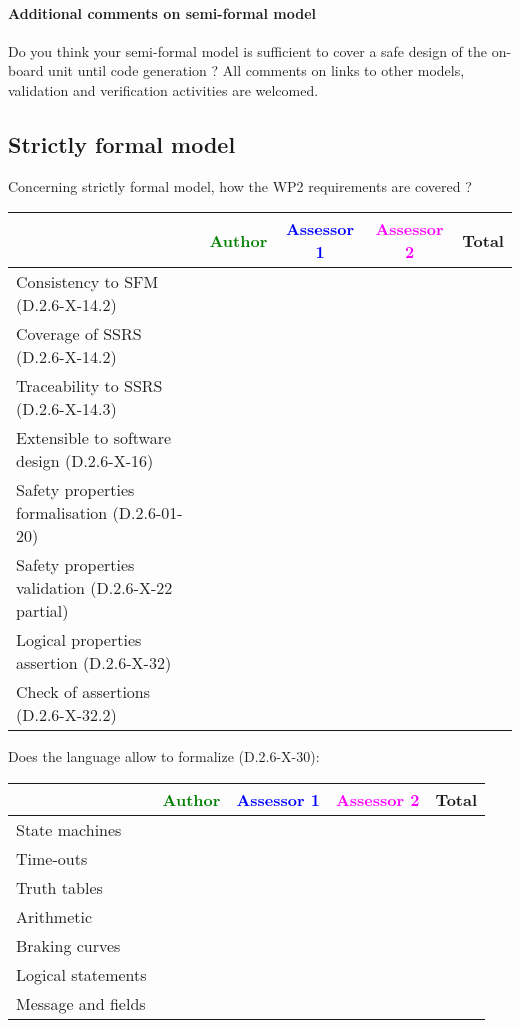 \paragraph{Additional comments on semi-formal  model} Do you think your semi-formal  model is sufficient to cover a safe design of the on-board unit until code generation ?
All comments on links to  other models, validation and verification activities are welcomed.

\subsection{Strictly formal model}

Concerning strictly formal model, how the WP2 requirements are covered ?

\begin{tabular}{|l | c | c | c | c|}
\hline
& \textcolor{green}{Author} & \textcolor{blue}{Assessor 1} & \textcolor{magenta}{Assessor 2} & Total \\
\hline 
Consistency to SFM (D.2.6-X-14.2) & & & &  \\
\hline
Coverage of SSRS (D.2.6-X-14.2)  & & & &  \\
\hline
Traceability to  SSRS (D.2.6-X-14.3)  & & & &  \\
\hline
Extensible to software design (D.2.6-X-16)  & & & &  \\
\hline
Safety properties formalisation (D.2.6-01-20)  & & & &  \\
\hline
Safety properties validation (D.2.6-X-22 partial)  & & & &  \\
\hline
Logical properties assertion (D.2.6-X-32)  & & & &  \\
\hline
Check  of assertions (D.2.6-X-32.2)  & & & &  \\
\hline
\end{tabular}

Does the language allow to  formalize (D.2.6-X-30):

\begin{tabular}{|l | c | c | c | c|}
\hline
& \textcolor{green}{Author} & \textcolor{blue}{Assessor 1} & \textcolor{magenta}{Assessor 2} & Total \\
\hline 
State machines  & & & &  \\
\hline
Time-outs  & & & &  \\
\hline
Truth tables  & & & &  \\
\hline
Arithmetic  & & & &  \\
\hline
Braking curves  & & & &  \\
\hline
Logical statements & & & &  \\
\hline
Message and fields & & & &  \\
\hline
\end{tabular}

